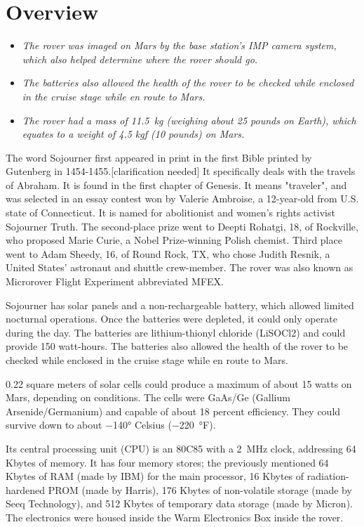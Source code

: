 \section{Overview}\label{overview}

\begin{itemize}
\item
  \emph{The rover was imaged on Mars by the base station's IMP camera
  system, which also helped determine where the rover should go.}
\item
  \emph{The batteries also allowed the health of the rover to be checked
  while enclosed in the cruise stage while en route to Mars.}
\item
  \emph{The rover had a mass of 11.5~kg (weighing about 25 pounds on
  Earth), which equates to a weight of 4.5 kgf (10 pounds) on Mars.}
\end{itemize}

The word Sojourner first appeared in print in the first Bible printed by
Gutenberg in 1454-1455.{[}clarification needed{]} It specifically deals
with the travels of Abraham. It is found in the first chapter of
Genesis. It means "traveler", and was selected in an essay contest won
by Valerie Ambroise, a 12-year-old from U.S. state of Connecticut. It is
named for abolitionist and women's rights activist Sojourner Truth. The
second-place prize went to Deepti Rohatgi, 18, of Rockville, who
proposed Marie Curie, a Nobel Prize-winning Polish chemist. Third place
went to Adam Sheedy, 16, of Round Rock, TX, who chose Judith Resnik, a
United States' astronaut and shuttle crew-member. The rover was also
known as Microrover Flight Experiment abbreviated MFEX.

Sojourner has solar panels and a non-rechargeable battery, which allowed
limited nocturnal operations. Once the batteries were depleted, it could
only operate during the day. The batteries are lithium-thionyl chloride
(LiSOCl2) and could provide 150 watt-hours. The batteries also allowed
the health of the rover to be checked while enclosed in the cruise stage
while en route to Mars.

0.22 square meters of solar cells could produce a maximum of about 15
watts on Mars, depending on conditions. The cells were GaAs/Ge (Gallium
Arsenide/Germanium) and capable of about 18 percent efficiency. They
could survive down to about −140° Celsius (−220~°F).

Its central processing unit (CPU) is an 80C85 with a 2~MHz clock,
addressing 64 Kbytes of memory. It has four memory stores; the
previously mentioned 64 Kbytes of RAM (made by IBM) for the main
processor, 16 Kbytes of radiation-hardened PROM (made by Harris), 176
Kbytes of non-volatile storage (made by Seeq Technology), and 512 Kbytes
of temporary data storage (made by Micron). The electronics were housed
inside the Warm Electronics Box inside the rover.


